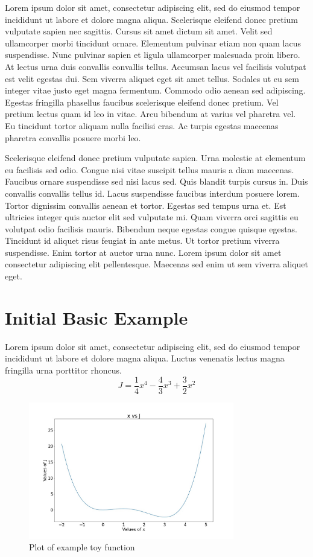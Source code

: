 \documentclass{cup-ino}
\begin{document}
Lorem ipsum dolor sit amet, consectetur adipiscing elit, sed do eiusmod tempor incididunt ut labore et dolore magna aliqua. Scelerisque eleifend donec pretium vulputate sapien nec sagittis. Cursus sit amet dictum sit amet. Velit sed ullamcorper morbi tincidunt ornare. Elementum pulvinar etiam non quam lacus suspendisse. Nunc pulvinar sapien et ligula ullamcorper malesuada proin libero. At lectus urna duis convallis convallis tellus. Accumsan lacus vel facilisis volutpat est velit egestas dui. Sem viverra aliquet eget sit amet tellus. Sodales ut eu sem integer vitae justo eget magna fermentum. Commodo odio aenean sed adipiscing. Egestas fringilla phasellus faucibus scelerisque eleifend donec pretium. Vel pretium lectus quam id leo in vitae. Arcu bibendum at varius vel pharetra vel. Eu tincidunt tortor aliquam nulla facilisi cras. Ac turpis egestas maecenas pharetra convallis posuere morbi leo.

Scelerisque eleifend donec pretium vulputate sapien. Urna molestie at elementum eu facilisis sed odio. Congue nisi vitae suscipit tellus mauris a diam maecenas. Faucibus ornare suspendisse sed nisi lacus sed. Quis blandit turpis cursus in. Duis convallis convallis tellus id. Lacus suspendisse faucibus interdum posuere lorem. Tortor dignissim convallis aenean et tortor. Egestas sed tempus urna et. Est ultricies integer quis auctor elit sed vulputate mi. Quam viverra orci sagittis eu volutpat odio facilisis mauris. Bibendum neque egestas congue quisque egestas. Tincidunt id aliquet risus feugiat in ante metus. Ut tortor pretium viverra suspendisse. Enim tortor at auctor urna nunc. Lorem ipsum dolor sit amet consectetur adipiscing elit pellentesque. Maecenas sed enim ut sem viverra aliquet eget.

\section{Initial Basic Example}

Lorem ipsum dolor sit amet, consectetur adipiscing elit, sed do eiusmod tempor incididunt ut labore et dolore magna aliqua. Luctus venenatis lectus magna fringilla urna porttitor rhoncus.
\begin{equation} 
\label{eu_eqn}
J = \frac{1}{4}x^4-\frac{4}{3}x^3+\frac{3}{2}x^2
\end{equation}

\begin{figure}
\centering
\includegraphics[width=0.8\textwidth]{images/toy_ex.jpeg}
\caption{Plot of example toy function}
\label{fig:toyfunc}
\end{figure}
\end{document}
